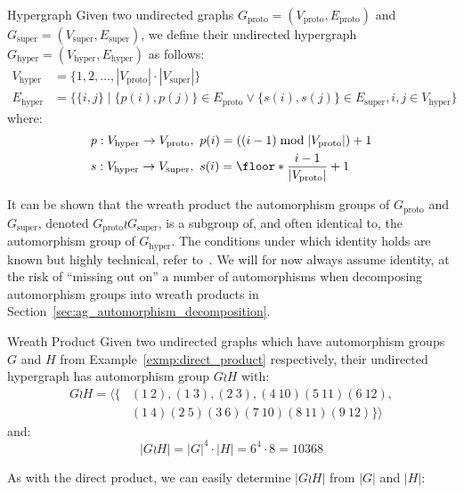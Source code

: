 \begin{defn}[label=defn:hypergraph]{Hypergraph}
  Given two undirected graphs $G_{\mathrm{proto}} = (V_{\mathrm{proto}},
  E_{\mathrm{proto}})$ and $G_{\mathrm{super}} = (V_{\mathrm{super}},
  E_{\mathrm{super}})$, we define their undirected hypergraph $G_{\mathrm{hyper}}
  = (V_{\mathrm{hyper}}, E_{\mathrm{hyper}})$ as
  follows:
  \begin{align*}
    V_{\mathrm{hyper}} &= \{1,2,\dots,|V_{\mathrm{proto}}| \cdot |V_{\mathrm{super}}|\} \\
    E_{\mathrm{hyper}} &= \{\{i, j\} \mid \{p(i), p(j)\} \in E_{\mathrm{proto}}
                                     \lor \{s(i), s(j)\} \in E_{\mathrm{super}},
                                          i, j \in V_{\mathrm{hyper}}\}
  \end{align*}
  where:
  \begin{align*}
    &p: V_{\mathrm{hyper}} \rightarrow V_{\mathrm{proto}},\ 
        p(i) = ((i - 1) \bmod |V_{\mathrm{proto}}|) + 1 \\
    &s: V_{\mathrm{hyper}} \rightarrow V_{\mathrm{super}},\ 
        s(i) = \floor*{\frac{i - 1}{|V_{\mathrm{proto}}|}} + 1
  \end{align*}
\end{defn}
%
It can be shown that the wreath product the automorphism groups of
$G_{\mathrm{proto}}$ and $G_{\mathrm{super}}$, denoted $G_{\mathrm{proto}} \wr
G_{\mathrm{super}}$, is a subgroup of, and often identical to, the automorphism
group of $G_{\mathrm{hyper}}$. The conditions under which identity holds are
known but highly technical, refer to~\cite{hemminger}. We will for now always
assume identity, at the risk of ``missing out on'' a number of automorphisms
when decomposing automorphism groups into wreath products in
Section~\ref{sec:ag_automorphism_decomposition}.

\begin{exmp}{Wreath Product}
  Given two undirected graphs which have automorphism groups $G$ and $H$ from
  Example~\ref{exmp:direct_product} respectively, their undirected hypergraph has
  automorphism group $G \wr H$ with:
  \begin{align*}
    G \wr H = \langle\{&(1\ 2),(1\ 3),(2\ 3),(4\ 10)(5\ 11)(6\ 12), \\
                       &(1\ 4)(2\ 5)(3\ 6)(7\ 10)(8\ 11)(9\ 12)\}\rangle
  \end{align*}
  and:
  \begin{equation*}
    |G \wr H| = |G|^4 \cdot |H| = 6^4 \cdot 8 = 10368
  \end{equation*}
\end{exmp}
%
As with the direct product, we can easily determine $|G \wr H|$ from $|G|$ and
$|H|$:

